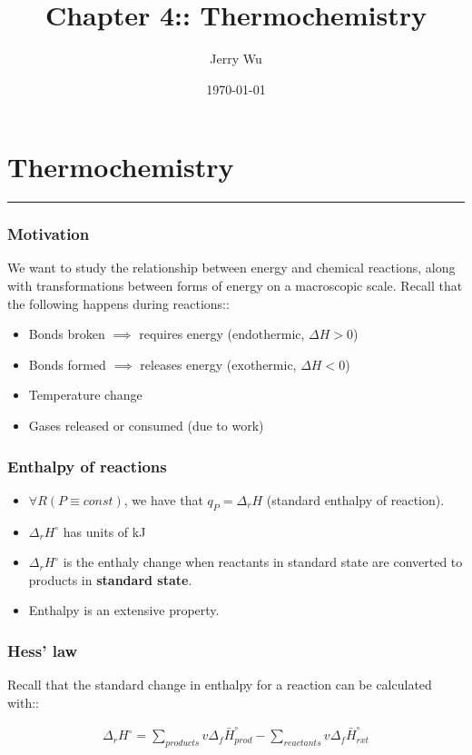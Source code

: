 \documentclass[12pt]{book}
\title{Chapter 4:: Thermochemistry}
\author{Jerry Wu}
\date{\today}
\begin{document}
\maketitle
\chapter*{Thermochemistry}
\rule{\textwidth}{0.4pt}

\subsection*{Motivation}
We want to study the relationship between energy and chemical reactions, along with transformations between forms of energy on a macroscopic scale. Recall that the following happens during reactions::

\begin{itemize}
    \item Bonds broken $\implies$ requires energy (endothermic, $\Delta H>0$)
    \item Bonds formed $\implies$ releases energy (exothermic, $\Delta H<0$)
    \item Temperature change
    \item Gases released or consumed (due to work)
\end{itemize}

\subsection*{Enthalpy of reactions}
\begin{itemize}
    \item $\forall R(P\equiv const)$, we have that $q_P=\Delta_r H$ (standard enthalpy of reaction).
    \item $\Delta_r H^{\circ}$ has units of kJ
    \item $\Delta_r H^{\circ}$ is the enthaly change when reactants in standard state are converted to products in \textbf{standard state}.
    \item Enthalpy is an extensive property.
\end{itemize}

\subsection*{Hess' law}

Recall that the standard change in enthalpy for a reaction can be calculated with::

\begin{align*}
    \Delta_r H^{\circ}=\sum_{products} v\Delta_f \bar{H}^{\circ}_{prod}-\sum_{reactants} v\Delta_f \bar{H}^{\circ}_{rxt}
\end{align*}
\end{document}
